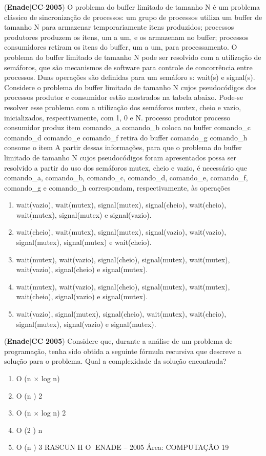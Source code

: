 \documentclass{exam}
\begin{document}
\begin{questions}
\begin{enumerate}[label=\alph*)]
	\end{enumerate}

\question (\textbf{Enade}$|$\textbf{CC}-\textbf{2005}) O problema do buffer limitado de tamanho N é um
problema clássico de sincronização de processos: um grupo de
processos utiliza um buffer de tamanho N para armazenar
temporariamente itens produzidos; processos produtores
produzem os itens, um a um, e os armazenam no buffer;
processos consumidores retiram os itens do buffer, um a um,
para processamento. O problema do buffer limitado de tamanho
N pode ser resolvido com a utilização de semáforos, que são
mecanismos de software para controle de concorrência entre
processos. Duas operações são definidas para um semáforo
s: wait(s) e signal(s).
Considere o problema do buffer limitado de tamanho N
cujos pseudocódigos dos processos produtor e consumidor
estão mostrados na tabela abaixo. Pode-se resolver esse
problema com a utilização dos semáforos mutex, cheio e vazio,
inicializados, respectivamente, com 1, 0 e N.
processo produtor processo consumidor
produz item
comando\_a
comando\_b
coloca no buffer
comando\_c
comando\_d
comando\_e
comando\_f
retira do buffer
comando\_g
comando\_h
consome o item
A partir dessas informações, para que o problema do buffer
limitado de tamanho N cujos pseudocódigos foram
apresentados possa ser resolvido a partir do uso dos semáforos
mutex, cheio e vazio, é necessário que comando\_a,
comando\_b, comando\_c, comando\_d, comando\_e,
comando\_f, comando\_g e comando\_h correspondam,
respectivamente, às operações
	\begin{enumerate}[label=\alph*)]
		\item  wait(vazio), wait(mutex), signal(mutex),
signal(cheio), wait(cheio), wait(mutex),
signal(mutex) e signal(vazio).
		\item  wait(cheio), wait(mutex), signal(mutex),
signal(vazio), wait(vazio), signal(mutex),
signal(mutex) e wait(cheio).
		\item  wait(mutex), wait(vazio), signal(cheio),
signal(mutex), wait(mutex), wait(vazio),
signal(cheio) e signal(mutex).
		\item  wait(mutex), wait(vazio), signal(cheio),
signal(mutex), wait(mutex), wait(cheio),
signal(vazio) e signal(mutex).
		\item  wait(vazio), signal(mutex), signal(cheio),
wait(mutex), wait(cheio), signal(mutex),
signal(vazio) e signal(mutex).

	\end{enumerate}

\question (\textbf{Enade}$|$\textbf{CC}-\textbf{2005}) Considere que, durante a análise de um problema de programação,
tenha sido obtida a seguinte fórmula recursiva que descreve a
solução para o problema.
Qual a complexidade da solução encontrada?
	\begin{enumerate}[label=\alph*)]
		\item  O (n × log n)
		\item  O (n )
2
		\item  O (n × log n)
2
		\item  O (2 )
n
		\item  O (n )
3
RASCUN H O
ENADE – 2005 Área: COMPUTAÇÃO 19


\end{enumerate}
\end{questions}
\end{document}
